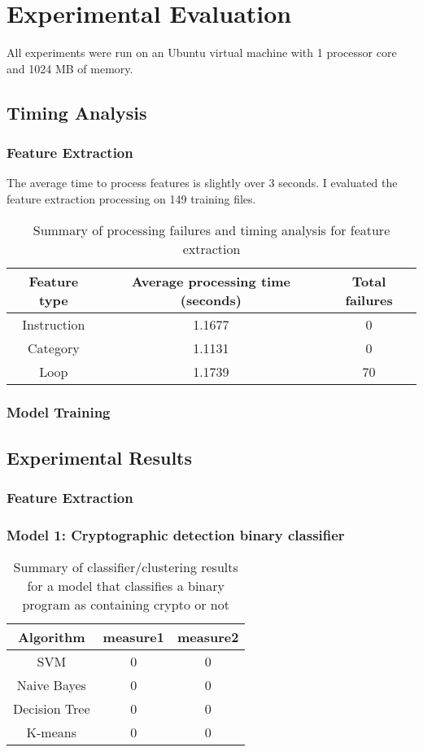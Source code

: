 \chapter{Experimental Evaluation}
All experiments were run on an Ubuntu virtual machine with 1 processor core and 1024 MB of memory.


\section{Timing Analysis}
\subsection{Feature Extraction}
The average time to process features is slightly over 3 seconds.  I evaluated the feature extraction processing on 149 training files.

\begin{center}
\begin{table}
\begin{tabular}{c|cc}
\textbf{Feature type} & \textbf{Average processing time (seconds)} & \textbf{Total failures}\\
\hline
Instruction & 1.1677 & 0\\
Category & 1.1131 & 0\\
Loop & 1.1739 & 70
\end{tabular}
\label{featureprocessing}
\caption{Summary of processing failures and timing analysis for feature extraction}
\end{table}
\end{center}


\subsection{Model Training}


\section{Experimental Results}
\subsection{Feature Extraction}

\subsection{Model 1: Cryptographic detection binary classifier}
\begin{center}
\begin{table}[H]
\begin{tabular}{c|cc}
\textbf{Algorithm} & \textbf{measure1} & \textbf{measure2}\\
\hline
SVM & 0 & 0\\
Naive Bayes & 0 & 0\\
Decision Tree & 0 & 0\\
K-means & 0 & 0 \\
\end{tabular}
\caption{Summary of classifier/clustering results for a model that classifies a binary program as containing crypto or not}\label{model1}
\end{table}
\end{center}

